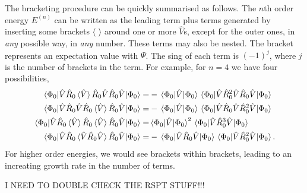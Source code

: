 The bracketing procedure can be quickly summarised as follows. The $n$th order 
energy $E^{(n)}$ can be written as the leading term plus terms generated by inserting 
some brackets $\langle$ $\rangle$ around one or more $\hat{V}$s, except for the outer 
ones, in \emph{any} possible way, in \emph{any} number. These terms may also be nested.
The bracket represents an expectation value with $\Psi$. The sing of each term is 
$(-1)^j$, where $j$ is the number of brackets in the term. 
For example, for $n=4$ we have four possibilities,
\begin{align}
    \mel{\Phi_0}{\hat{V}\hat{R}_0\ev*{\hat{V}}\hat{R}_0\hat{V}\hat{R}_0\hat{V}}{\Phi_0}
        =& - \mel{\Phi_0}{\hat{V}}{\Phi_0}
            \mel{\Phi_0}{\hat{V}\hat{R}_0^2\hat{V}\hat{R}_0\hat{V}}{\Phi_0} \\
    \mel{\Phi_0}{\hat{V}\hat{R}_0\hat{V}\hat{R}_0\ev*{\hat{V}}\hat{R}_0\hat{V}}{\Phi_0}
        =& - \mel{\Phi_0}{\hat{V}}{\Phi_0}
            \mel{\Phi_0}{\hat{V}\hat{R}_0\hat{V}\hat{R}_0^2\hat{V}}{\Phi_0} \\
    \mel{\Phi_0}{\hat{V}\hat{R}_0\ev*{\hat{V}}\hat{R}_0\ev*{\hat{V}}\hat{R}_0\hat{V}}{\Phi_0}
        =&  \mel{\Phi_0}{\hat{V}}{\Phi_0}^2
            \mel{\Phi_0}{\hat{V}\hat{R}_0^3\hat{V}}{\Phi_0} \\
    \mel{\Phi_0}{\hat{V}\hat{R}_0\ev*{\hat{V}\hat{R}_0\hat{V}}\hat{R}_0\hat{V}}{\Phi_0}
        =& - \mel{\Phi_0}{\hat{V}\hat{R}_0\hat{V}}{\Phi_0}
            \mel{\Phi_0}{\hat{V}\hat{R}_0^2\hat{V}}{\Phi_0}.
\end{align}
For higher order energies, we would see brackets within brackets, leading to an increating 
growth rate in the number of terms.

I NEED TO DOUBLE CHECK THE RSPT STUFF!!!